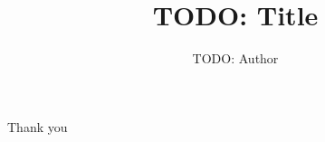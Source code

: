 \documentclass[11pt,notes=hide,aspectratio=169,mathserif]{beamer}
\title[TODO]{TODO: Title}
\author[TODO]{TODO: Author}
\date{\monthname[\the\month] \the\year}
\begin{document}
\begin{frame}[plain]
\titlepage
\note{
	\begin{itemize}
	\end{itemize}
}
\end{frame}


\begin{frame}[plain]
\begin{center}{\LARGE Thank you}\end{center}
\end{frame}


\appendix
%


\end{document}
